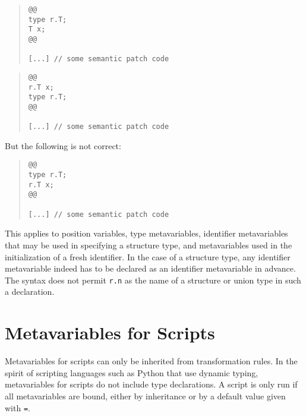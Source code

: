 \begin{quote}
\begin{verbatim}
@@
type r.T;
T x;
@@

[...] // some semantic patch code
\end{verbatim}
\end{quote}

\begin{quote}
\begin{verbatim}
@@
r.T x;
type r.T;
@@

[...] // some semantic patch code
\end{verbatim}
\end{quote}

\noindent
But the following is not correct:

\begin{quote}
\begin{verbatim}
@@
type r.T;
r.T x;
@@

[...] // some semantic patch code
\end{verbatim}
\end{quote}

This applies to position variables, type metavariables, identifier
metavariables that may be used in specifying a structure type, and
metavariables used in the initialization of a fresh identifier.  In the
case of a structure type, any identifier metavariable indeed has to be
declared as an identifier metavariable in advance.  The syntax does not
permit {\tt r.n} as the name of a structure or union type in such a
declaration.

\section{Metavariables for Scripts}

Metavariables for scripts can only be inherited from transformation rules.
In the spirit of scripting languages such as Python that use dynamic
typing, metavariables for scripts do not include type declarations.
A script is only run if all metavariables are bound, either by inheritance
or by a default value given with {\tt =}.

\begin{grammar}

    


\end{grammar}


